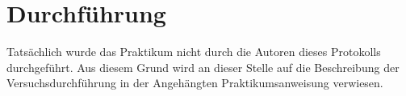 \section{Durchführung}
\label{sec:durchfuerung}
Tatsächlich wurde das Praktikum nicht durch die Autoren dieses Protokolls durchgeführt. Aus diesem Grund wird an dieser Stelle auf die Beschreibung der Versuchsdurchführung in der Angehängten Praktikumsanweisung verwiesen.

\newpage

